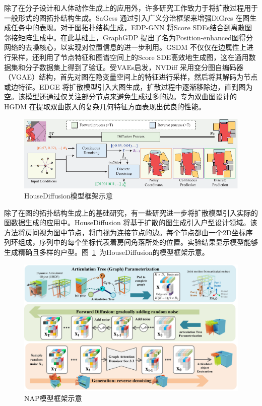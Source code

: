 除了在分子设计和人体动作生成上的应用外，许多研究工作致力于将扩散过程用于一般形式的图拓扑结构生成。SaGess \cite{sagess_limnios_23}通过引入广义分治框架来增强DiGres \cite{digress_vignac_22}在图生成任务中的表现。对于图拓扑结构生成，EDP-GNN \cite{edpgnn_niu_20}将Score SDEs结合到离散图邻接矩阵生成中。在此基础上，GraphGDP \cite{graphgdp_huang_22}提出了名为Position-enhanced图得分网络的去噪核心，以实现对位置信息的进一步利用。GSDM \cite{gsdm_luo_22}不仅仅在边属性上进行采样，还利用了节点特征和图谱空间上的Score SDE高效地生成图，这在通用数据集和分子数据集上得到了验证。受VAEs启发，NVDiff \cite{nvdiff_chen_22}采用变分图自编码器（VGAE）结构，首先对图在隐变量空间上的特征进行采样，然后将其解码为节点或边特征。EDGE \cite{edge_chen_23}将扩散模型引入大图生成，扩散过程中逐渐移除边，直到图为空。该模型还通过仅关注部分节点来避免生成过多的边。专为双曲图设计的HGDM \cite{hgdm_wen_23}在提取双曲嵌入的复杂几何特征方面表现出优良的性能。

\begin{figure}[h]
  \centering
  \includegraphics[width=1.0\linewidth]{figures/housediffusion.pdf}
  \caption{HouseDiffusion模型框架示意 \cite{housediffusion_shabani_23}}
  \label{fig:housediffusion}
\end{figure}

除了在图的拓扑结构生成上的基础研究，有一些研究进一步将扩散模型引入实际的图数据生成的应用中。HouseDiffusion \cite{housediffusion_shabani_23}将基于扩散的图生成引入户型设计领域。该方法将房间视为图中节点，将门视为连接节点的边。每个节点都由一个2D坐标序列环组成，序列中的每个坐标代表着房间角落所处的位置。实验结果显示模型能够生成精确且多样的户型。图~\ref{fig:housediffusion}~为HouseDiffusion的模型框架示意。

\begin{figure}[h]
  \centering
  \includegraphics[width=1.0\linewidth]{figures/nap.jpg}
  \caption{NAP模型框架示意 \cite{nap_lei_23}}
  \label{fig:nap}
\end{figure}

